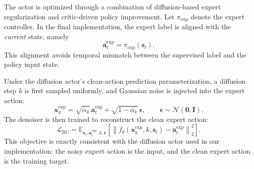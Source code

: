 \documentclass[lettersize,journal]{IEEEtran}
\theoremstyle{nonumberplain}     \theoremheaderfont{\bfseries\itshape}     \theorembodyfont{\normalfont}     \theoremseparator{:}     \theoremsymbol{\ensuremath{\blacksquare}}     \newtheorem{proof}{Proof}
\theoremstyle{plain}     \theoremheaderfont{\bfseries\itshape}     \theorembodyfont{\normalfont}     \theoremseparator{:}     \theoremsymbol{\ensuremath{\blacksquare}}     \newtheorem{remark}{Remark}
\begin{document}
The actor is optimized through a combination of diffusion-based expert regularization and critic-driven policy improvement. Let $\pi_{\mathrm{exp}}$ denote the expert controller. In the final implementation, the expert label is aligned with the \emph{current} state, namely
\begin{equation}
\mathbf{a}_t^{\mathrm{exp}}
=
\pi_{\mathrm{exp}}(\mathbf{s}_t).
\label{eq:expert_alignment}
\end{equation}
This alignment avoids temporal mismatch between the supervised label and the policy input state.

Under the diffusion actor's clean-action prediction parameterization, a diffusion step $k$ is first sampled uniformly, and Gaussian noise is injected into the expert action:
\begin{equation}
\mathbf{x}_{k}^{\mathrm{exp}}
=
\sqrt{\bar{\alpha}_{k}}\,\mathbf{a}_t^{\mathrm{exp}}
+
\sqrt{1-\bar{\alpha}_{k}}\,\boldsymbol{\epsilon},
\qquad
\boldsymbol{\epsilon}\sim\mathcal{N}(\mathbf{0},\mathbf{I}).
\label{eq:expert_noisy}
\end{equation}
The denoiser is then trained to reconstruct the clean expert action:
\begin{equation}
\mathcal{L}_{\mathrm{BC}}
=
\mathbb{E}_{\mathbf{s}_t,\mathbf{a}_t^{\mathrm{exp}},k,\boldsymbol{\epsilon}}
\left[
\left\|
f_{\theta}(\mathbf{x}_{k}^{\mathrm{exp}},k,\mathbf{s}_t)
-
\mathbf{a}_t^{\mathrm{exp}}
\right\|_2^2
\right].
\label{eq:bc_loss}
\end{equation}
This objective is exactly consistent with the diffusion actor used in our implementation: the noisy expert action is the input, and the clean expert action is the training target.
\end{document}
